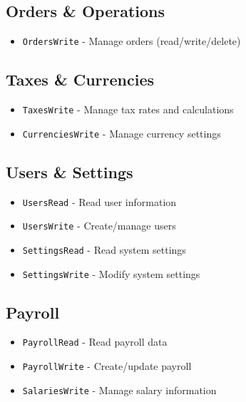 \subsection{Orders \& Operations}\label{orders-operations}

\begin{itemize}
\tightlist
\item
  \texttt{OrdersWrite} - Manage orders (read/write/delete)
\end{itemize}

\subsection{Taxes \& Currencies}\label{taxes-currencies}

\begin{itemize}
\tightlist
\item
  \texttt{TaxesWrite} - Manage tax rates and calculations
\item
  \texttt{CurrenciesWrite} - Manage currency settings
\end{itemize}

\subsection{Users \& Settings}\label{users-settings}

\begin{itemize}
\tightlist
\item
  \texttt{UsersRead} - Read user information
\item
  \texttt{UsersWrite} - Create/manage users
\item
  \texttt{SettingsRead} - Read system settings
\item
  \texttt{SettingsWrite} - Modify system settings
\end{itemize}

\subsection{Payroll}\label{payroll}

\begin{itemize}
\tightlist
\item
  \texttt{PayrollRead} - Read payroll data
\item
  \texttt{PayrollWrite} - Create/update payroll
\item
  \texttt{SalariesWrite} - Manage salary information
\end{itemize}


